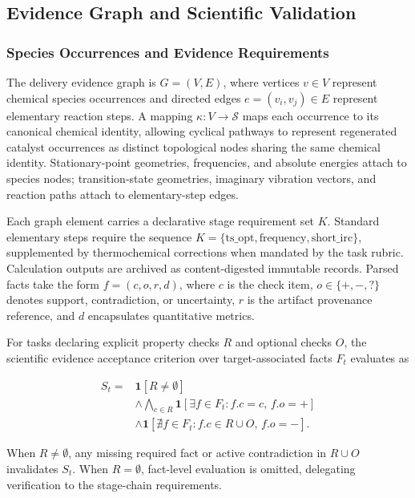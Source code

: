 \subsection{Evidence Graph and Scientific Validation}

\subsubsection{Species Occurrences and Evidence Requirements}
The delivery evidence graph is $G=(V,E)$, where vertices $v\in V$ represent chemical species occurrences and directed edges $e=(v_i,v_j)\in E$ represent elementary reaction steps. A mapping $\kappa:V\to\mathcal{S}$ maps each occurrence to its canonical chemical identity, allowing cyclical pathways to represent regenerated catalyst occurrences as distinct topological nodes sharing the same chemical identity. Stationary-point geometries, frequencies, and absolute energies attach to species nodes; transition-state geometries, imaginary vibration vectors, and reaction paths attach to elementary-step edges.

Each graph element carries a declarative stage requirement set $K$. Standard elementary steps require the sequence $K=\{\text{ts\_opt}, \text{frequency}, \text{short\_irc}\}$, supplemented by thermochemical corrections when mandated by the task rubric. Calculation outputs are archived as content-digested immutable records. Parsed facts take the form $f=(c,o,r,d)$, where $c$ is the check item, $o\in\{+,-,?\}$ denotes support, contradiction, or uncertainty, $r$ is the artifact provenance reference, and $d$ encapsulates quantitative metrics.

For tasks declaring explicit property checks $R$ and optional checks $O$, the scientific evidence acceptance criterion over target-associated facts $F_t$ evaluates as

\begin{equation}\label{eq:methods-09}
\begin{aligned}
S_t={}&\mathbf{1}[R\ne\emptyset]\\
&\wedge\bigwedge_{c\in R}\mathbf{1}[\exists f\in F_t:f.c=c,\,f.o=+]\\
&\wedge\mathbf{1}[\nexists f\in F_t:f.c\in R\cup O,\,f.o=-].
\end{aligned}
\end{equation}

When $R\ne\emptyset$, any missing required fact or active contradiction in $R\cup O$ invalidates $S_t$. When $R=\emptyset$, fact-level evaluation is omitted, delegating verification to the stage-chain requirements.

